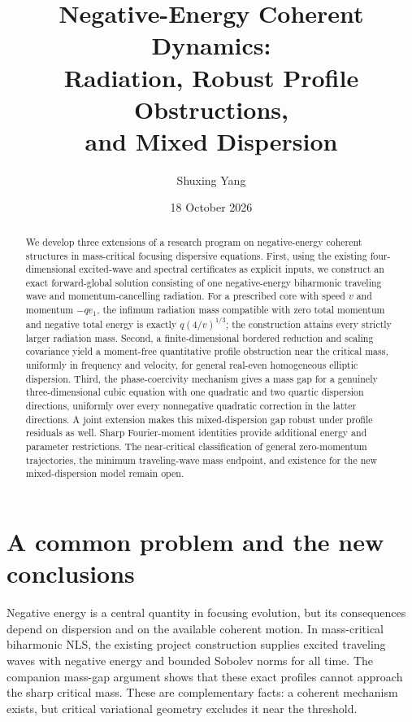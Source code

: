\documentclass[11pt]{article}
\title{\bfseries Negative-Energy Coherent Dynamics:\\
Radiation, Robust Profile Obstructions,\\and Mixed Dispersion}
\author{Shuxing Yang}
\date{18 October 2026}
\theoremstyle{definition}
\theoremstyle{remark}
\begin{document}
\maketitle
\begin{abstract}
We develop three extensions of a research program on negative-energy coherent structures in mass-critical focusing dispersive equations. First, using the existing four-dimensional excited-wave and spectral certificates as explicit inputs, we construct an exact forward-global solution consisting of one negative-energy biharmonic traveling wave and momentum-cancelling radiation. For a prescribed core with speed $v$ and momentum $-q e_1$, the infimum radiation mass compatible with zero total momentum and negative total energy is exactly $q(4/v)^{1/3}$; the construction attains every strictly larger radiation mass. Second, a finite-dimensional bordered reduction and scaling covariance yield a moment-free quantitative profile obstruction near the critical mass, uniformly in frequency and velocity, for general real-even homogeneous elliptic dispersion. Third, the phase-coercivity mechanism gives a mass gap for a genuinely three-dimensional cubic equation with one quadratic and two quartic dispersion directions, uniformly over every nonnegative quadratic correction in the latter directions. A joint extension makes this mixed-dispersion gap robust under profile residuals as well. Sharp Fourier-moment identities provide additional energy and parameter restrictions. The near-critical classification of general zero-momentum trajectories, the minimum traveling-wave mass endpoint, and existence for the new mixed-dispersion model remain open.
\end{abstract}

\section{A common problem and the new conclusions}

Negative energy is a central quantity in focusing evolution, but its consequences depend on dispersion and on the available coherent motion. In mass-critical biharmonic NLS, the existing project construction supplies excited traveling waves with negative energy and bounded Sobolev norms for all time. The companion mass-gap argument shows that these exact profiles cannot approach the sharp critical mass. These are complementary facts: a coherent mechanism exists, but critical variational geometry excludes it near the threshold.
\end{document}
